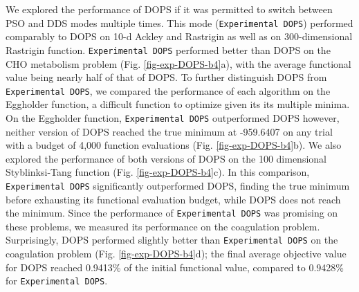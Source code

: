 \documentclass{bmcart}
\begin{document}
We explored the performance of DOPS if it was permitted to switch between PSO and DDS modes multiple times.
This mode (\texttt{Experimental~DOPS}) performed comparably to DOPS on 10-d Ackley and Rastrigin as well as on 300-dimensional Rastrigin function.
\texttt{Experimental~DOPS} performed better than DOPS on the CHO metabolism problem (Fig. \ref{fig-exp-DOPS-b4}a),
with the average functional value being nearly half of that of DOPS.
To further distinguish DOPS from \texttt{Experimental~DOPS}, we compared the performance of each algorithm on the Eggholder function,
a difficult function to optimize given its its multiple minima.
On the Eggholder function, \texttt{Experimental~DOPS} outperformed DOPS however, neither version of DOPS reached the true minimum at -959.6407 on any trial with a budget of 4,000 function evaluations (Fig. \ref{fig-exp-DOPS-b4}b).
We also explored the performance of both versions of DOPS on the 100 dimensional Styblinksi-Tang function \cite{jamil2013literature} (Fig. \ref{fig-exp-DOPS-b4}c).
In this comparison, \texttt{Experimental~DOPS} significantly outperformed DOPS, finding the true minimum before exhausting its functional evaluation budget, while DOPS does not reach the minimum.
Since the performance of \texttt{Experimental~DOPS} was promising on these problems, we measured its performance on the coagulation problem.
Surprisingly, DOPS performed slightly better than \texttt{Experimental~DOPS} on the coagulation problem (Fig. \ref{fig-exp-DOPS-b4}d);
the final average objective value for DOPS reached 0.9413\% of the initial functional value, compared to 0.9428\% for \texttt{Experimental~DOPS}.
\end{document}

